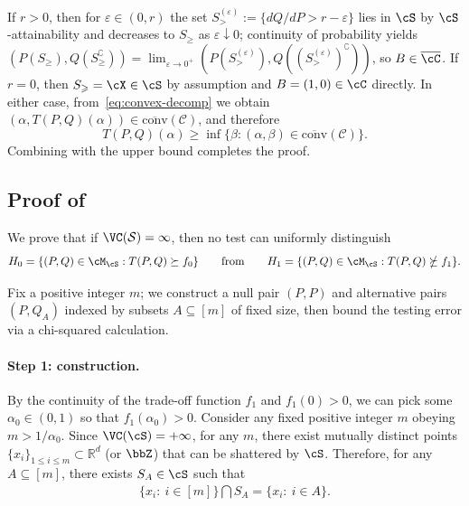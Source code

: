 \documentclass[english]{article}
\theoremstyle{plain}
\theoremstyle{definition}
\newcommand{\Toff}[2]{T(#1,#2)}
\newcommand{\fnull}{f_0}
\newcommand{\falt}{f_1}
\newcommand{\convclosure}{\overline{\mathrm{conv}}}
\begin{document}
If $r>0$, then for $\varepsilon\in(0,r)$ the set $S_{>}^{(\varepsilon)}:=\{dQ/dP>r-\varepsilon\}$ lies in $\cS$ by $\cS$-attainability and decreases to $S_{\geqslant}$ as $\varepsilon\downarrow 0$; continuity of probability yields $(P(S_{\geqslant}),Q(S_{\geqslant}^\complement))=\lim_{\varepsilon\to 0^+}(P(S_{>}^{(\varepsilon)}),Q((S_{>}^{(\varepsilon)})^\complement))$, so $B\in\overline{\cC}$. If $r=0$, then $S_{\geqslant}=\cX\in\cS$ by assumption and $B=(1,0)\in\cC$ directly. In either case, from~\eqref{eq:convex-decomp} we obtain $(\alpha, \Toff{P}{Q}(\alpha)) \in \convclosure(\mathcal{C})$, and therefore
\[
\Toff{P}{Q}(\alpha) \geqslant \inf\bigl\{\beta : (\alpha,\beta) \in \convclosure(\mathcal{C})\bigr\}.
\]
Combining with the upper bound completes the proof.


\subsection{Proof of }\label{sec:VC-necessity}


We prove that if $\VC(\mathcal S)=\infty$, then no test can uniformly distinguish
\[
H_0=\{(P,Q)\in\cM_{\cS}: \Toff{P}{Q}\succeq \fnull\}
\qquad\text{from}\qquad
H_1=\{(P,Q)\in\cM_{\cS}: \Toff{P}{Q}\nsucceq \falt\}.
\]

Fix a positive integer $m$; we construct a null pair $(P,P)$ and alternative pairs $(P,Q_A)$ indexed by subsets $A\subseteq[m]$ of fixed size, then bound the testing error via a chi-squared calculation.

\paragraph{Step 1: construction.}
By the continuity of the trade-off function $\falt$ and $\falt(0) > 0$, we can pick some $\alpha_0\in(0,1)$ so that $\falt(\alpha_0)>0$. 
Consider any fixed positive integer $m$ obeying $m>1/\alpha_0$.
Since $\VC(\cS)=+\infty$, for any $m$, there exist mutually distinct points $\{x_i\}_{1 \leqslant i \leqslant m}\subset \mathbb{R}^d$ (or $\bbZ$) that can be shattered by $\cS$. Therefore, for any $A\subseteq [m]$, there exists $S_A\in\cS$ such that
\begin{align*}
    \{x_i:\ i\in[m]\}\bigcap S_A=\{x_i:\ i\in A\}.
\end{align*}
\end{document}
